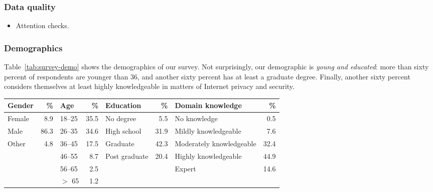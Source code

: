 \subsubsection{Data quality}
\begin{itemize}
    \item Attention checks.
\end{itemize}

\subsubsection{Demographics}
Table~\ref{tab:survey-demo} shows the demographics of our survey.  Not
surprisingly, our demographic is \emph{young and educated}: more than sixty
percent of respondents are younger than 36, and another sixty percent has at
least a graduate degree.  Finally, another sixty percent considers themselves
at least highly knowledgeable in matters of Internet privacy and security.

\begin{table*}[ht]
	\centering
	\begin{tabular}{l r l r l r l r}
	\toprule
	Gender & \% &
	Age & \% &
	Education & \% &
	Domain knowledge & \% \\
	\midrule
	Female & 8.9  & 18--25   & 35.5 & No degree     & 5.5  & No knowledge             & 0.5  \\
	Male   & 86.3 & 26--35   & 34.6 & High school   & 31.9 & Mildly knowledgeable     & 7.6  \\
	Other  & 4.8  & 36--45   & 17.5 & Graduate      & 42.3 & Moderately knowledgeable & 32.4 \\
	       &      & 46--55   & 8.7  & Post graduate & 20.4 & Highly knowledgeable     & 44.9 \\
	       &      & 56--65   & 2.5  &               &      & Expert                   & 14.6 \\
	       &      & $>$ 65   & 1.2  &               &      & & \\
	\bottomrule
	\end{tabular}
	\caption{The distribution over gender, age, education, and domain knowledge 
	for our 621 interview subjects.}
	\label{tab:survey-demo}
\end{table*}

